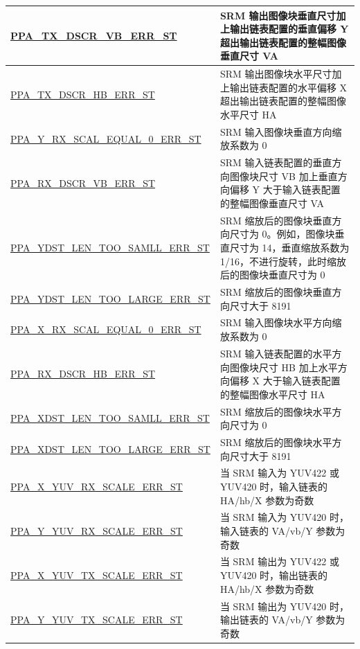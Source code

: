 \documentclass[main\_\_CN.tex]{subfiles}
\begin{document}
\begin{longtable}[c]{ |p{6cm}|p{10cm}| }
        \hyperref[fielddesc:PPATXDSCRVBERRST]{PPA\_TX\_DSCR\_VB\_ERR\_ST} & SRM 输出图像块垂直尺寸加上输出链表配置的垂直偏移 Y 超出输出链表配置的整幅图像垂直尺寸 VA \\\hline
        \hyperref[fielddesc:PPATXDSCRHBERRST]{PPA\_TX\_DSCR\_HB\_ERR\_ST} & SRM 输出图像块水平尺寸加上输出链表配置的水平偏移 X 超出输出链表配置的整幅图像水平尺寸 HA \\\hline
        \hyperref[fielddesc:PPAYRXSCALEQUAL0ERRST]{PPA\_Y\_RX\_SCAL\_EQUAL\_0\_ERR\_ST} & SRM 输入图像块垂直方向缩放系数为 0 \\\hline
        \hyperref[fielddesc:PPARXDSCRVBERRST]{PPA\_RX\_DSCR\_VB\_ERR\_ST} & SRM 输入链表配置的垂直方向图像块尺寸 VB 加上垂直方向偏移 Y 大于输入链表配置的整幅图像垂直尺寸 VA \\\hline
        \hyperref[fielddesc:PPAYDSTLENTOOSAMLLERRST]{PPA\_YDST\_LEN\_TOO\_SAMLL\_ERR\_ST} & SRM 缩放后的图像块垂直方向尺寸为 0。例如，图像块垂直尺寸为 14，垂直缩放系数为 1/16，不进行旋转，此时缩放后的图像块垂直尺寸为 0 \\\hline
        \hyperref[fielddesc:PPAYDSTLENTOOLARGEERRST]{PPA\_YDST\_LEN\_TOO\_LARGE\_ERR\_ST} & SRM 缩放后的图像块垂直方向尺寸大于 8191 \\\hline
        \hyperref[fielddesc:PPAXRXSCALEQUAL0ERRST]{PPA\_X\_RX\_SCAL\_EQUAL\_0\_ERR\_ST} & SRM 输入图像块水平方向缩放系数为 0 \\\hline
        \hyperref[fielddesc:PPARXDSCRHBERRST]{PPA\_RX\_DSCR\_HB\_ERR\_ST} & SRM 输入链表配置的水平方向图像块尺寸 HB 加上水平方向偏移 X 大于输入链表配置的整幅图像水平尺寸 HA \\\hline
        \hyperref[fielddesc:PPAXDSTLENTOOSAMLLERRST]{PPA\_XDST\_LEN\_TOO\_SAMLL\_ERR\_ST} & SRM 缩放后的图像块水平方向尺寸为 0 \\\hline
        \hyperref[fielddesc:PPAXDSTLENTOOLARGEERRST]{PPA\_XDST\_LEN\_TOO\_LARGE\_ERR\_ST} & SRM 缩放后的图像块水平方向尺寸大于 8191 \\\hline
        \hyperref[fielddesc:PPAXYUVRXSCALEERRST]{PPA\_X\_YUV\_RX\_SCALE\_ERR\_ST} & 当 SRM 输入为 YUV422 或 YUV420 时，输入链表的 HA/hb/X 参数为奇数 \\\hline
        \hyperref[fielddesc:PPAYYUVRXSCALEERRST]{PPA\_Y\_YUV\_RX\_SCALE\_ERR\_ST} & 当 SRM 输入为 YUV420 时，输入链表的 VA/vb/Y 参数为奇数 \\\hline
        \hyperref[fielddesc:PPAXYUVTXSCALEERRST]{PPA\_X\_YUV\_TX\_SCALE\_ERR\_ST} & 当 SRM 输出为 YUV422 或 YUV420 时，输出链表的 HA/hb/X 参数为奇数 \\\hline
        \hyperref[fielddesc:PPAYYUVTXSCALEERRST]{PPA\_Y\_YUV\_TX\_SCALE\_ERR\_ST} & 当 SRM 输出为 YUV420 时，输出链表的 VA/vb/Y 参数为奇数 \\\hline

\end{longtable}
\end{document}
